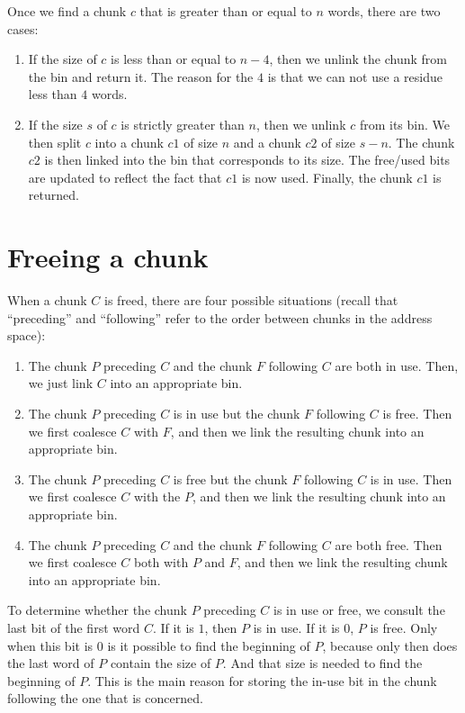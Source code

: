 Once we find a chunk $c$ that is greater than or equal to $n$ words,
there are two cases:

\begin{enumerate}
\item If the size of $c$ is less than or equal to $n-4$, then we
  unlink the chunk from the bin and return it.  The reason for the $4$
  is that we can not use a residue less than $4$ words.
\item If the size $s$ of $c$ is strictly greater than $n$, then we
  unlink $c$ from its bin.  We then split $c$ into a chunk $c1$ of
  size $n$ and a chunk $c2$ of size $s-n$.  The chunk $c2$ is then
  linked into the bin that corresponds to its size.  The free/used
  bits are updated to reflect the fact that $c1$ is now used.
  Finally, the chunk $c1$ is returned.
\end{enumerate}

\section{Freeing a chunk}

When a chunk $C$ is freed, there are four possible situations (recall
that ``preceding'' and ``following'' refer to the order between chunks
in the address space):

\begin{enumerate}
\item The chunk $P$ preceding $C$ and the chunk $F$ following $C$
  are both in use.  Then, we just link $C$ into an appropriate
  bin.
\item The chunk $P$ preceding $C$ is in use but the chunk $F$
  following $C$ is free.  Then we first coalesce $C$ with $F$, and
  then we link the resulting chunk into an appropriate bin.
\item The chunk $P$ preceding $C$ is free but the chunk $F$ following
  $C$ is in use.  Then we first coalesce $C$ with the $P$, and then we
  link the resulting chunk into an appropriate bin.
\item The chunk $P$ preceding $C$ and the chunk $F$ following $C$ are
  both free.  Then we first coalesce $C$ both with $P$ and $F$, and
  then we link the resulting chunk into an appropriate bin.
\end{enumerate}

To determine whether the chunk $P$ preceding $C$ is in use or free, we
consult the last bit of the first word $C$.  If it is $1$, then
$P$ is in use.  If it is $0$, $P$ is free.  Only when this bit is $0$ is
it possible to find the beginning of $P$, because only then does the
last word of $P$ contain the size of $P$.  And that size is needed to
find the beginning of $P$.  This is the main reason for storing the
in-use bit in the chunk following the one that is concerned.

